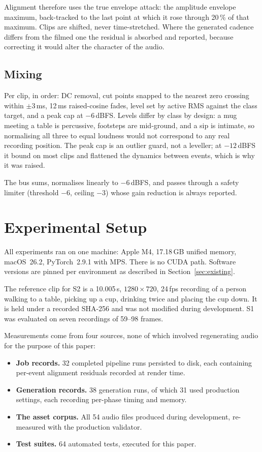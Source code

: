 \documentclass[conference]{IEEEtran}
\begin{document}
Alignment therefore uses the true envelope attack: the amplitude envelope
maximum, back-tracked to the last point at which it rose through 20\,\% of that
maximum. Clips are shifted, never time-stretched. Where the generated cadence
differs from the filmed one the residual is absorbed and reported, because
correcting it would alter the character of the audio.

\subsection{Mixing}

Per clip, in order: DC removal, cut points snapped to the nearest zero crossing
within $\pm3$\,ms, 12\,ms raised-cosine fades, level set by active RMS against the
class target, and a peak cap at $-6$\,dBFS. Levels differ by class by design: a
mug meeting a table is percussive, footsteps are mid-ground, and a sip is
intimate, so normalising all three to equal loudness would not correspond to any
real recording position. The peak cap is an outlier guard, not a leveller; at
$-12$\,dBFS it bound on most clips and flattened the dynamics between events,
which is why it was raised.

The bus sums, normalises linearly to $-6$\,dBFS, and passes through a safety
limiter (threshold $-6$, ceiling $-3$) whose gain reduction is always reported.

\section{Experimental Setup}

All experiments ran on one machine: Apple M4, 17.18\,GB unified memory,
macOS~26.2, PyTorch~2.9.1 with MPS. There is no CUDA path. Software versions are
pinned per environment as described in Section~\ref{sec:existing}.

The reference clip for S2 is a 10.005\,s, $1280\times720$, 24\,fps recording of a
person walking to a table, picking up a cup, drinking twice and placing the cup
down. It is held under a recorded SHA-256 and was not modified during
development. S1 was evaluated on seven recordings of 59--98 frames.

Measurements come from four sources, none of which involved regenerating audio
for the purpose of this paper:

\begin{itemize}
\item \textbf{Job records.} 32 completed pipeline runs persisted to disk, each
      containing per-event alignment residuals recorded at render time.
\item \textbf{Generation records.} 38 generation runs, of which 31 used
      production settings, each recording per-phase timing and memory.
\item \textbf{The asset corpus.} All 54 audio files produced during development,
      re-measured with the production validator.
\item \textbf{Test suites.} 64 automated tests, executed for this paper.
\end{itemize}
\end{document}
